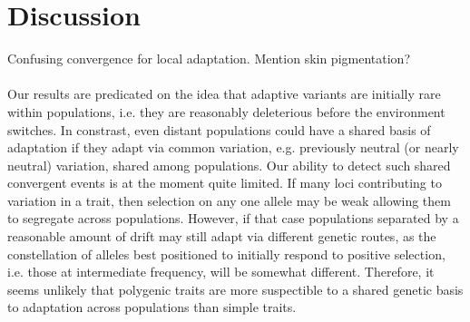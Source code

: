 \documentclass{article}
\begin{document}







\section{Discussion}


Confusing convergence for local adaptation. Mention skin pigmentation?


\paragraph{}
Our results are predicated on the idea that adaptive variants are
initially rare within populations, i.e. they are reasonably
deleterious before the environment switches. In constrast, even distant populations could have
a shared basis of adaptation if they adapt via common variation,
e.g. previously neutral (or nearly neutral) variation, shared among populations. 
Our ability to detect such shared convergent events is at the moment
quite limited. If many loci contributing to variation in a trait, then
selection on any one allele may be weak allowing them to segregate
across populations. However, if that
case populations separated by a reasonable amount of drift may still
adapt via different genetic routes, as the constellation of alleles
best positioned to initially respond to positive selection, i.e. those at
intermediate frequency, will be somewhat different. Therefore, it
seems unlikely that polygenic traits are more suspectible to a shared
genetic basis to adaptation across populations than simple traits.   

\end{document}
